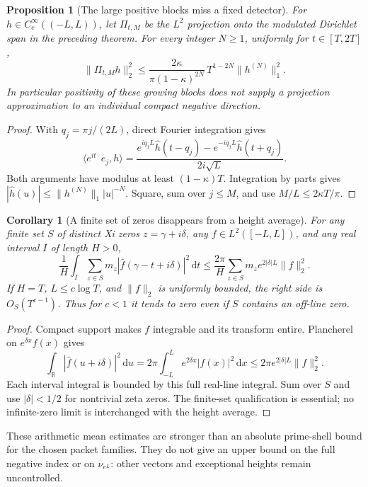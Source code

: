 \documentclass[11pt]{article}
\newtheorem{corollary}[theorem]{Corollary}
\newtheorem{proposition}[theorem]{Proposition}
\theoremstyle{remark}\newtheorem{remark}[theorem]{Remark}
\newcommand{\R}{\mathbb R}
\newcommand{\dd}{\,\mathrm d}
\begin{document}
\begin{proposition}[The large positive blocks miss a fixed detector]
\label{prop:dirichlet-escape}
For $h\in C_c^\infty((-L,L))$, let $\Pi_{t,M}$ be the $L^2$ projection
onto the modulated Dirichlet span in the preceding theorem.
For every integer $N\ge1$, uniformly for $t\in[T,2T]$,
\[
 \|\Pi_{t,M}h\|_2^2
 \le \frac{2\kappa}{\pi(1-\kappa)^{2N}}\,
                 T^{1-2N}\|h^{(N)}\|_1^2.              \tag{DE}
\]
In particular positivity of these growing blocks does not supply
a projection approximation to an individual compact negative direction.
\end{proposition}
\begin{proof}
With $q_j=\pi j/(2L)$, direct Fourier integration gives
\[
 \langle e^{it\cdot}e_j,h\rangle
 =\frac{e^{iq_jL}\widehat h(t-q_j)
                 -e^{-iq_jL}\widehat h(t+q_j)}{2i\sqrt L}.
\]
Both arguments have modulus at least $(1-\kappa)T$.
Integration by parts gives
$|\widehat h(u)|\le\|h^{(N)}\|_1|u|^{-N}$.
Square, sum over $j\le M$, and use $M/L\le2\kappa T/\pi$.
\end{proof}

\begin{corollary}[A finite set of zeros disappears from a height average]
\label{cor:averaged-zero-loss}
For any finite set $S$ of distinct Xi zeros $z=\gamma+i\delta$,
any $f\in L^2([-L,L])$, and any real interval $I$ of length $H>0$,
\[
 \frac1H\int_I\sum_{z\in S}m_z
       |\widehat f(\gamma-t+i\delta)|^2\dd t
 \le\frac{2\pi}{H}\sum_{z\in S}m_z e^{2|\delta|L}\|f\|_2^2.
                                                               \tag{AZ}
\]
If $H=T$, $L\le c\log T$, and $\|f\|_2$ is uniformly bounded,
the right side is $O_S(T^{c-1})$. Thus for $c<1$ it tends to
zero even if $S$ contains an off-line zero.
\end{corollary}
\begin{proof}
Compact support makes $f$ integrable and its transform entire.
Plancherel on $e^{\delta x}f(x)$ gives
\[
 \int_\R|\widehat f(u+i\delta)|^2\dd u
       =2\pi\int_{-L}^Le^{2\delta x}|f(x)|^2\dd x
       \le2\pi e^{2|\delta|L}\|f\|_2^2.
\]
Each interval integral is bounded by this full real-line integral.
Sum over $S$ and use $|\delta|<1/2$ for nontrivial zeta zeros.
The finite-set qualification is essential; no infinite-zero limit
is interchanged with the height average.
\end{proof}

These arithmetic mean estimates are stronger than an absolute
prime-shell bound for the chosen packet families. They do not give
an upper bound on the full negative index or on $\nu_{e^L}$:
other vectors and exceptional heights remain uncontrolled.
\end{document}
